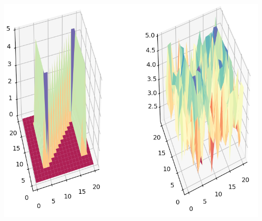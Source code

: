 \documentclass{report}
\begin{document}
\includegraphics[scale=0.5]{5.png}
\\\flushleft
\end{document}
